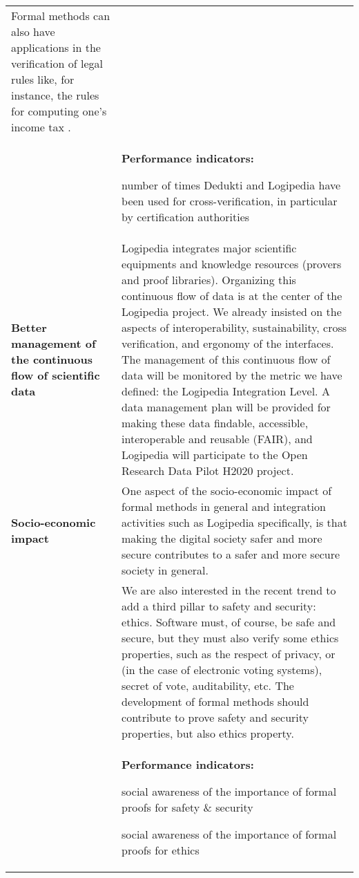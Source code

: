 \begin{longtable}{|p{}|p{}|}
Formal methods can also have applications in the verification of legal
rules like, for instance, the rules for computing one's income tax
\cite{merigoux20jfla}.
\\
&
\colorbox{color3}{\bf Performance indicators:}
\begin{compactitem}
\item number of times Dedukti and Logipedia have been used for 
cross-verification, in particular by certification authorities
\end{compactitem}
\\
\hline
{\bf Better management of the continuous flow of scientific data}
&
Logipedia integrates major scientific equipments and knowledge resources
(provers and proof libraries).
Organizing this continuous flow of data is at the center of the
Logipedia project. We already insisted on the aspects of interoperability,
sustainability, cross verification, and ergonomy of the interfaces. 
The management of this continuous flow of data will be monitored by the 
metric we have defined: the Logipedia Integration Level.
A data management plan will be provided for making these data findable,
accessible, interoperable and reusable (FAIR), and Logipedia will participate
to the Open Research Data Pilot H2020 project.
\\
\hline
{\bf Socio-economic impact}
&
One aspect of the socio-economic impact of formal methods in general
and integration activities such as Logipedia specifically, is that making the
digital society safer and more secure contributes to a safer and more
secure society in general.\\
&
\hspace{0.4cm} 
We are also interested in the recent trend to add a third pillar to
safety and security: ethics.  Software must, of course, be safe and
secure, but they must also verify some ethics properties, such as
the respect of privacy, or (in the case of electronic voting systems), 
secret of vote, auditability, etc.
The development of formal methods should contribute to prove 
safety and security properties, but also ethics property.
\\
&
\colorbox{color3}{\bf Performance indicators:}
\begin{compactitem}
\item social awareness of the importance of formal proofs for safety \&
security
\item social awareness of the importance of formal proofs for ethics

\end{compactitem}
\end{longtable}

